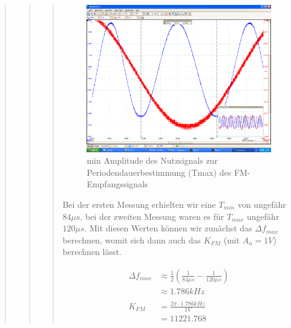 \begin{quote}
\begin{quote}
\begin{quote}
                     \begin{figure}[H]
                        \label{fig:}
                        \includegraphics[scale=0.2, trim = 0cm 1.5cm 0cm
                        2.5cm, clip]{./Bilder/aufgabe_4_12_sinus_low-ampl}
                        \caption{min Amplitude des Nutzsignals zur
                        Periodendauerbestimmung (Tmax) des FM-Empfangssignals}
                    \end{figure}
                   \vspace{-1.5em}
        
        Bei der ersten Messung erhielten wir eine $T_{min}$ von ungefähr 
        $84\mu s$, bei der zweiten Messung waren es für $T_{max}$ ungefähr 
        $120\mu s$. Mit diesen Werten können wir zunächst das $\Delta f_{max}$
        berechnen, womit sich dann auch das $K_{FM}$ (mit $A_u = 1V$) berechnen
        lässt.
        
      \begin{equation*}
       \begin{split}
		\Delta f_{max} &\approx \frac{1}{2} (\frac{1}{84\mu s} - \frac{1}{120\mu s})\\
					   &\approx 1.786 kHz \\
		\\		
	    K_{FM} &= \frac{2 \pi \cdot 1.786 kHz}{1 V}\\
	    	   &= 11221.768    		
       \end{split}
     \end{equation*}
     

\end{quote}
\end{quote}
\end{quote}

